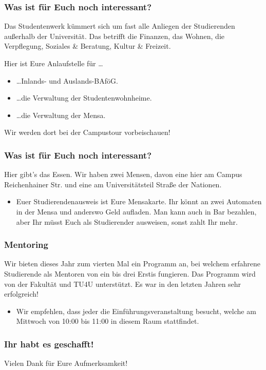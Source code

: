 \documentclass[10pt]{beamer}
\begin{document}
\begin{frame}
	\frametitle{Was ist für Euch noch interessant?}

	\begin{block}{\vphantom{X}}
		Das Studentenwerk kümmert sich um fast alle Anliegen der Studierenden außerhalb der Universität. Das betrifft die Finanzen, das Wohnen, die Verpflegung, Soziales \& Beratung, Kultur \& Freizeit.
	\end{block}

	Hier ist Eure Anlaufstelle für \ldots

	\begin{itemize}
		\item \ldots Inlands- und Auslands-BAföG.
		\item \ldots die Verwaltung der Studentenwohnheime.
		\item \ldots die Verwaltung der Mensa.
	\end{itemize}

	Wir werden dort bei der Campustour vorbeischauen! 
\end{frame}

\begin{frame}
	\frametitle{Was ist für Euch noch interessant?}

	\begin{block}{\vphantom{X}}
		Hier gibt's das Essen. Wir haben zwei Mensen, davon eine hier am Campus Reichenhainer Str. und eine am Universitätsteil Straße der Nationen.
	\end{block}

	\begin{itemize}
		\item Euer Studierendenausweis ist Eure Mensakarte. Ihr könnt an zwei Automaten in der Mensa und anderswo Geld aufladen. Man kann auch in Bar bezahlen, aber Ihr müsst Euch als Studierender ausweisen, sonst zahlt Ihr mehr.
	\end{itemize}
\end{frame}

\begin{frame}
	\frametitle{Mentoring}

	\begin{block}{\vphantom{X}}
		Wir bieten dieses Jahr zum vierten Mal ein Programm an, bei welchem erfahrene Studierende als Mentoren von ein bis drei Erstis fungieren. Das Programm wird von der Fakultät und TU4U unterstützt. Es war in den letzten Jahren sehr erfolgreich!
	\end{block}
	
	\begin{itemize}
		\item Wir empfehlen, dass jeder die Einführungsveranstaltung besucht, welche am Mittwoch von 10:00 bis 11:00 in diesem Raum stattfindet.
	\end{itemize}
\end{frame}

\begin{frame}
	\frametitle{Ihr habt es geschafft!}

	Vielen Dank für Eure Aufmerksamkeit!
\end{frame}
\end{document}

